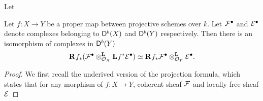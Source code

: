 \begin{proposition}
    \label{flat base change formula}
    Let
\end{proposition}

\begin{proposition}
    \label{projection formula}
    Let $f \colon X \to Y$ be a proper map between projective schemes over $k$. Let $\mathcal F^\bullet$ and $\mathcal E^\bullet$ denote complexes belonging to $\mathsf{D}^b(X)$ and $\mathsf{D}^b(Y)$ respectively. Then there is an isomorphism of complexes in $\mathsf{D}^b(Y)$
    \begin{equation}
        \label{eq: projection formula}
        \rderived{}{f_*}(\derivedtensor{\F^\bullet}{\lderived{}{f^*\E^\bullet}}{\struct{X}}) \iso \derivedtensor{\rderived{}{f_*}\F^\bullet}{\E^\bullet}{\struct{Y}}.
    \end{equation}
\end{proposition}

\begin{proof}
    We first recall the underived version of the projection formula, which states that for any morphism of $f \colon X \to Y$, coherent sheaf $\mathcal F$ and locally free sheaf $\mathcal E$  
\end{proof}